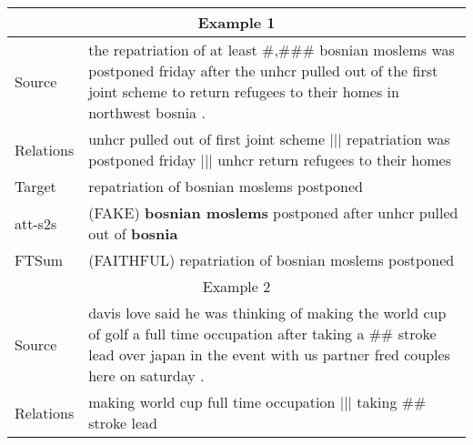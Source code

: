 \documentclass[letterpaper]{article} \usepackage{aaai18}  \usepackage{times}  \usepackage{helvet}  \usepackage{courier}  \usepackage{url}  \usepackage{graphicx}  \usepackage{amsfonts}
\begin{document}
	
	\begin{table*}[ht]
		\centering
		\begin{tabularx}{\linewidth}{p{1.2cm}|X}
			\hline
			\multicolumn{2}{c}{Example 1}                                                                                                                                                                                              \\ \hline
			\multicolumn{1}{l|}{Source}    & the repatriation of at least \#,\#\#\# bosnian moslems was postponed friday after the unhcr pulled out of the first joint scheme to return refugees to their homes in northwest bosnia .                      \\ \hline
			\multicolumn{1}{l|}{Relations} & unhcr pulled out of first joint scheme $|||$ repatriation was postponed friday $|||$ unhcr return refugees to their homes                                                                            \\ \hline
			\multicolumn{1}{l|}{Target}    & repatriation of bosnian moslems postponed                                                                                                                              \\ \hline
			\multicolumn{1}{l|}{att-s2s}   & (FAKE) \textbf{bosnian moslems} postponed after unhcr pulled out of \textbf{bosnia}                                                                                                                \\ \hline
			\multicolumn{1}{l|}{FTSum}     & (FAITHFUL) repatriation of bosnian moslems postponed                                                                                                               \\ \hline
\multicolumn{2}{c}{Example 2}                                                                                                                                                                                              \\ \hline
			\multicolumn{1}{l|}{Source}    & davis love said he was thinking of making the world cup of golf a full time occupation after taking a \#\# stroke lead over japan in the event with us partner fred couples here on saturday .                                                    \\ \hline
			\multicolumn{1}{l|}{Relations} & making world cup full time occupation $|||$ taking \#\# stroke lead                                                                                                                       \\ \hline

\end{tabularx}
\end{table*}
\end{document}

